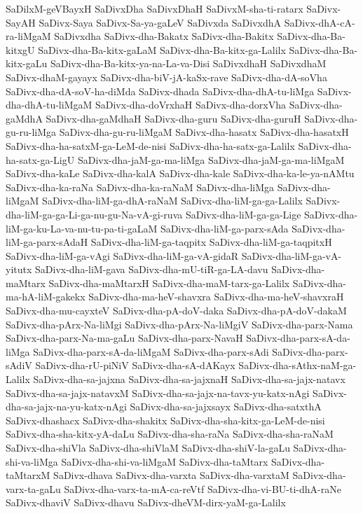 {SaDilxM-geVBayxH
SaDivxDha
SaDivxDhaH
SaDivxM-sha-ti-ratarx
SaDivx-SayAH
SaDivx-Saya
SaDivx-Sa-ya-gaLeV
SaDivxda
SaDivxdhA
SaDivx-dhA-cA-ra-liMgaM
SaDivxdha
SaDivx-dha-Bakatx
SaDivx-dha-Bakitx
SaDivx-dha-Ba-kitxgU
SaDivx-dha-Ba-kitx-gaLaM
SaDivx-dha-Ba-kitx-ga-Lalilx
SaDivx-dha-Ba-kitx-gaLu
SaDivx-dha-Ba-kitx-ya-na-La-va-Disi
SaDivxdhaH
SaDivxdhaM
SaDivx-dhaM-gayayx
SaDivx-dha-biV-jA-kaSx-rave
SaDivx-dha-dA-soVha
SaDivx-dha-dA-soV-ha-diMda
SaDivx-dhada
SaDivx-dha-dhA-tu-liMga
SaDivx-dha-dhA-tu-liMgaM
SaDivx-dha-doVrxhaH
SaDivx-dha-dorxVha
SaDivx-dha-gaMdhA
SaDivx-dha-gaMdhaH
SaDivx-dha-guru
SaDivx-dha-guruH
SaDivx-dha-gu-ru-liMga
SaDivx-dha-gu-ru-liMgaM
SaDivx-dha-hasatx
SaDivx-dha-hasatxH
SaDivx-dha-ha-satxM-ga-LeM-de-nisi
SaDivx-dha-ha-satx-ga-Lalilx
SaDivx-dha-ha-satx-ga-LigU
SaDivx-dha-jaM-ga-ma-liMga
SaDivx-dha-jaM-ga-ma-liMgaM
SaDivx-dha-kaLe
SaDivx-dha-kalA
SaDivx-dha-kale
SaDivx-dha-ka-le-ya-nAMtu
SaDivx-dha-ka-raNa
SaDivx-dha-ka-raNaM
SaDivx-dha-liMga
SaDivx-dha-liMgaM
SaDivx-dha-liM-ga-dhA-raNaM
SaDivx-dha-liM-ga-ga-Lalilx
SaDivx-dha-liM-ga-ga-Li-ga-nu-gu-Na-vA-gi-ruva
SaDivx-dha-liM-ga-ga-Lige
SaDivx-dha-liM-ga-ku-La-va-nu-tu-pa-ti-gaLaM
SaDivx-dha-liM-ga-parx-sAda
SaDivx-dha-liM-ga-parx-sAdaH
SaDivx-dha-liM-ga-taqpitx
SaDivx-dha-liM-ga-taqpitxH
SaDivx-dha-liM-ga-vAgi
SaDivx-dha-liM-ga-vA-gidaR
SaDivx-dha-liM-ga-vA-yitutx
SaDivx-dha-liM-gava
SaDivx-dha-mU-tiR-ga-LA-davu
SaDivx-dha-maMtarx
SaDivx-dha-maMtarxH
SaDivx-dha-maM-tarx-ga-Lalilx
SaDivx-dha-ma-hA-liM-gakekx
SaDivx-dha-ma-heV-shavxra
SaDivx-dha-ma-heV-shavxraH
SaDivx-dha-mu-cayxteV
SaDivx-dha-pA-doV-daka
SaDivx-dha-pA-doV-dakaM
SaDivx-dha-pArx-Na-liMgi
SaDivx-dha-pArx-Na-liMgiV
SaDivx-dha-parx-Nama
SaDivx-dha-parx-Na-ma-gaLu
SaDivx-dha-parx-NavaH
SaDivx-dha-parx-sA-da-liMga
SaDivx-dha-parx-sA-da-liMgaM
SaDivx-dha-parx-sAdi
SaDivx-dha-parx-sAdiV
SaDivx-dha-rU-piNiV
SaDivx-dha-sA-dAKayx
SaDivx-dha-sAthx-naM-ga-Lalilx
SaDivx-dha-sa-jajxna
SaDivx-dha-sa-jajxnaH
SaDivx-dha-sa-jajx-natavx
SaDivx-dha-sa-jajx-natavxM
SaDivx-dha-sa-jajx-na-tavx-yu-katx-nAgi
SaDivx-dha-sa-jajx-na-yu-katx-nAgi
SaDivx-dha-sa-jajxsayx
SaDivx-dha-satxthA
SaDivx-dhashacx
SaDivx-dha-shakitx
SaDivx-dha-sha-kitx-ga-LeM-de-nisi
SaDivx-dha-sha-kitx-yA-daLu
SaDivx-dha-sha-raNa
SaDivx-dha-sha-raNaM
SaDivx-dha-shiVla
SaDivx-dha-shiVlaM
SaDivx-dha-shiV-la-gaLu
SaDivx-dha-shi-va-liMga
SaDivx-dha-shi-va-liMgaM
SaDivx-dha-taMtarx
SaDivx-dha-taMtarxM
SaDivx-dhava
SaDivx-dha-varxta
SaDivx-dha-varxtaM
SaDivx-dha-varx-ta-gaLu
SaDivx-dha-varx-ta-mA-ca-reVtf
SaDivx-dha-vi-BU-ti-dhA-raNe
SaDivx-dhaviV
SaDivx-dhavu
SaDivx-dheVM-dirx-yaM-ga-Lalilx
}
